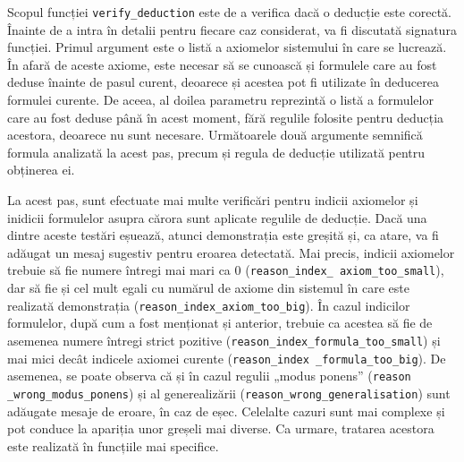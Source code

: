 \documentclass[12pt, openany]{book}
\begin{document}
            \par{}
                Scopul funcției \texttt{verify\_deduction} este de a verifica dacă o deducție este corectă. Înainte de a 
                intra în detalii pentru fiecare caz considerat, va fi discutată signatura funcției. Primul argument este 
                o listă a axiomelor sistemului în care se lucrează. În afară de aceste axiome, este necesar să se 
                cunoască și formulele care au fost deduse înainte de pasul curent, deoarece și acestea pot fi utilizate 
                în deducerea formulei curente. De aceea, al doilea parametru reprezintă o listă a formulelor care au 
                fost deduse până în acest moment, fără regulile folosite pentru deducția acestora, deoarece nu sunt 
                necesare. Următoarele două argumente semnifică formula analizată la acest pas, precum și regula de 
                deducție utilizată pentru obținerea ei. 
            
            \par{}
                La acest pas, sunt efectuate mai multe verificări pentru indicii axiomelor și inidicii formulelor asupra 
                cărora sunt aplicate regulile de deducție. Dacă una dintre aceste testări eșuează, atunci demonstrația 
                este greșită și, ca atare, va fi adăugat un mesaj sugestiv pentru eroarea detectată. Mai precis, indicii 
                axiomelor trebuie să fie numere întregi mai mari ca 0 (\texttt{reason\_index\_ axiom\_too\_small}), dar 
                să fie și cel mult egali cu numărul de axiome din sistemul în care este realizată demonstrația 
                (\texttt{reason\_index\_axiom\_too\_big}). În cazul indicilor formulelor, după cum a fost menționat și 
                anterior, trebuie ca acestea să fie de asemenea numere întregi strict pozitive 
                (\texttt{reason\_index\_formula\_too\_small}) și mai mici decât indicele axiomei curente 
                (\texttt{reason\_index \_formula\_too\_big}). De asemenea, se poate observa că și în cazul regulii „modus 
                ponens” (\texttt{reason \_wrong\_modus\_ponens}) și al generealizării 
                (\texttt{reason\_wrong\_generalisation}) sunt adăugate mesaje de eroare, în caz de eșec. Celelalte 
                cazuri sunt mai complexe și pot conduce la apariția unor greșeli mai diverse. Ca urmare, tratarea 
                acestora este realizată în funcțiile mai specifice.
            
\end{document}
